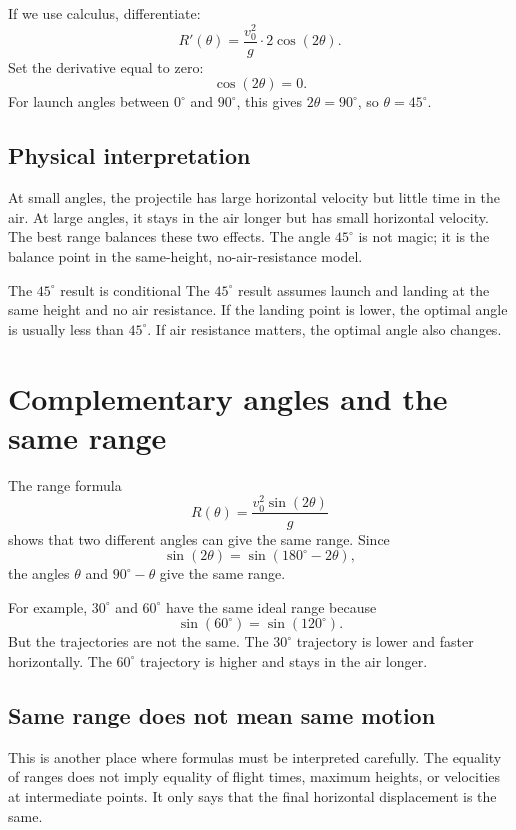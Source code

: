 \documentclass[11pt,a4paper]{article}
\begin{document}
If we use calculus, differentiate:
\[
R'(\theta)=\frac{v_0^2}{g}\cdot 2\cos(2\theta).
\]
Set the derivative equal to zero:
\[
\cos(2\theta)=0.
\]
For launch angles between $0^\circ$ and $90^\circ$, this gives $2\theta=90^\circ$, so $\theta=45^\circ$.

\subsection{Physical interpretation}

At small angles, the projectile has large horizontal velocity but little time in the air. At large angles, it stays in the air longer but has small horizontal velocity. The best range balances these two effects. The angle $45^\circ$ is not magic; it is the balance point in the same-height, no-air-resistance model.

\begin{warningbox}{The $45^\circ$ result is conditional}
The $45^\circ$ result assumes launch and landing at the same height and no air resistance. If the landing point is lower, the optimal angle is usually less than $45^\circ$. If air resistance matters, the optimal angle also changes.
\end{warningbox}

\section{Complementary angles and the same range}

The range formula
\[
R(\theta)=\frac{v_0^2\sin(2\theta)}{g}
\]
shows that two different angles can give the same range. Since
\[
\sin(2\theta)=\sin(180^\circ-2\theta),
\]
the angles $\theta$ and $90^\circ-\theta$ give the same range.

For example, $30^\circ$ and $60^\circ$ have the same ideal range because
\[
\sin(60^\circ)=\sin(120^\circ).
\]
But the trajectories are not the same. The $30^\circ$ trajectory is lower and faster horizontally. The $60^\circ$ trajectory is higher and stays in the air longer.

\subsection{Same range does not mean same motion}

This is another place where formulas must be interpreted carefully. The equality of ranges does not imply equality of flight times, maximum heights, or velocities at intermediate points. It only says that the final horizontal displacement is the same.
\end{document}
